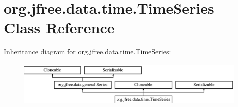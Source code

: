 \hypertarget{classorg_1_1jfree_1_1data_1_1time_1_1_time_series}{}\section{org.\+jfree.\+data.\+time.\+Time\+Series Class Reference}
\label{classorg_1_1jfree_1_1data_1_1time_1_1_time_series}
Inheritance diagram for org.\+jfree.\+data.\+time.\+Time\+Series\+:\begin{figure}[H]
\begin{center}
\leavevmode
\includegraphics[height=2.222222cm]{classorg_1_1jfree_1_1data_1_1time_1_1_time_series}
\end{center}
\end{figure}
